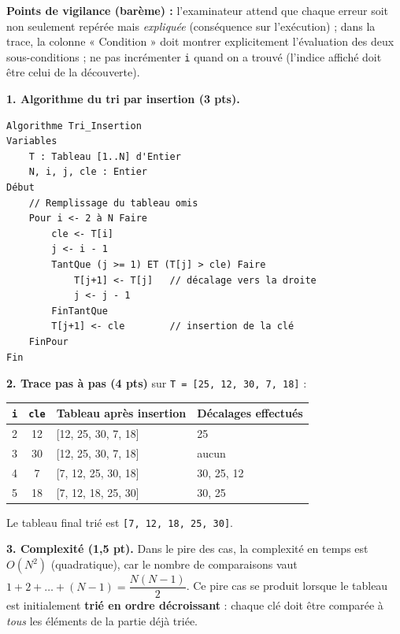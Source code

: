\documentclass[11pt]{article}
\begin{document}
\begin{corrige}
\textbf{Points de vigilance (barème) :} l'examinateur attend que chaque erreur soit non seulement repérée mais \emph{expliquée} (conséquence sur l'exécution) ; dans la trace, la colonne « Condition » doit montrer explicitement l'évaluation des deux sous-conditions ; ne pas incrémenter \texttt{i} quand on a trouvé (l'indice affiché doit être celui de la découverte).
\end{corrige}

\begin{corrige}
\textbf{1. Algorithme du tri par insertion (3 pts).}
\begin{lstlisting}
Algorithme Tri_Insertion
Variables
    T : Tableau [1..N] d'Entier
    N, i, j, cle : Entier
Début
    // Remplissage du tableau omis
    Pour i <- 2 à N Faire
        cle <- T[i]
        j <- i - 1
        TantQue (j >= 1) ET (T[j] > cle) Faire
            T[j+1] <- T[j]   // décalage vers la droite
            j <- j - 1
        FinTantQue
        T[j+1] <- cle        // insertion de la clé
    FinPour
Fin
\end{lstlisting}

\textbf{2. Trace pas à pas (4 pts)} sur \texttt{T = [25, 12, 30, 7, 18]} :

\begin{center}
\begin{tabularx}{\linewidth}{|c|c|X|l|}
\hline
\rowcolor{popblueL}
\texttt{i} & \texttt{cle} & Tableau après insertion & Décalages effectués \\
\hline
2 & 12 & [12, 25, 30, 7, 18] & 25 \\
\hline
3 & 30 & [12, 25, 30, 7, 18] & aucun \\
\hline
4 & 7 & [7, 12, 25, 30, 18] & 30, 25, 12 \\
\hline
5 & 18 & [7, 12, 18, 25, 30] & 30, 25 \\
\hline
\end{tabularx}
\end{center}

Le tableau final trié est \texttt{[7, 12, 18, 25, 30]}.

\textbf{3. Complexité (1,5 pt).} Dans le pire des cas, la complexité en temps est $O(N^2)$ (quadratique), car le nombre de comparaisons vaut $1 + 2 + \dots + (N-1) = \dfrac{N(N-1)}{2}$. Ce pire cas se produit lorsque le tableau est initialement \textbf{trié en ordre décroissant} : chaque clé doit être comparée à \emph{tous} les éléments de la partie déjà triée.


\end{corrige}
\end{document}
